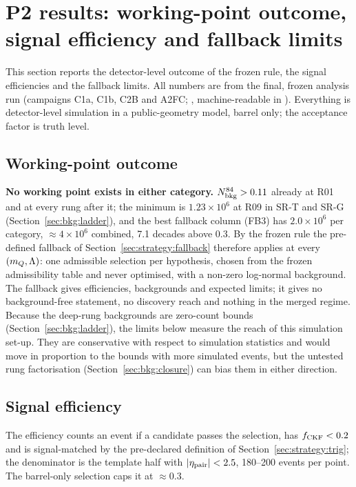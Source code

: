 \section{P2 results: working-point outcome, signal efficiency and fallback limits}\label{sec:results}

This section reports the detector-level outcome of the frozen rule, the signal efficiencies and the fallback limits. All
numbers are from the final, frozen analysis run (campaigns C1a, C1b, C2B and A2FC; ,
machine-readable in ). Everything is detector-level simulation in a
public-geometry model, barrel only; the acceptance factor is truth level.

\subsection{Working-point outcome}\label{sec:results:wp}
\textbf{No working point exists in either category.} $N_{\rm bkg}^{84}>0.11$ already at R01 and at every rung after it;
the minimum is $1.23\times10^6$ at R09 in SR-T and SR-G (Section~\ref{sec:bkg:ladder}), and the best fallback column
(FB3) has $2.0\times10^6$ per category, $\approx4\times10^6$ combined, 7.1 decades above 0.3. By the frozen rule the
pre-defined fallback of Section~\ref{sec:strategy:fallback} therefore applies at every $(m_Q,\Lambda)$: one admissible
selection per hypothesis, chosen from the frozen admissibility table and never optimised, with a non-zero log-normal
background. The fallback gives efficiencies, backgrounds and expected limits; it gives no background-free statement, no
discovery reach and nothing in the merged regime. Because the deep-rung backgrounds are zero-count bounds
(Section~\ref{sec:bkg:ladder}), the limits below measure the reach of this simulation set-up. They are conservative
with respect to simulation statistics and would move in proportion to the bounds with more simulated events, but the
untested rung factorisation (Section~\ref{sec:bkg:closure}) can bias them in either direction.

\subsection{Signal efficiency}\label{sec:results:eff}
The efficiency counts an event if a candidate passes the selection, has $f_{\rm CKF}<0.2$ and is signal-matched by the
pre-declared definition of Section~\ref{sec:strategy:trig}; the denominator is the template half with $|\eta_{\rm
pair}|<2.5$, 180--200 events per point. The barrel-only selection caps it at $\approx0.3$.

